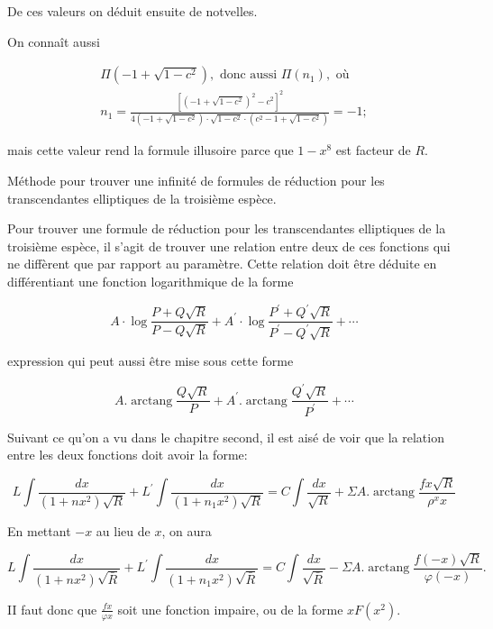 \documentclass{article}
\begin{document}
De ces valeurs on déduit ensuite de notvelles.

On connaît aussi

\[
\begin{gathered}
\Pi\left(-1+\sqrt{1-c^{2}}\right), \text { donc aussi } \Pi\left(n_{1}\right), \text { où } \\
n_{1}=\frac{\left[\left(-1+\sqrt{1-c^{2}}\right)^{2}-c^{2}\right]^{2}}{4\left(-1+\sqrt{1-c^{2}}\right) \cdot \sqrt{1-c^{2}} \cdot\left(c^{2}-1+\sqrt{1-c^{2}}\right)}=-1 ;
\end{gathered}
\]

mais cette valeur rend la formule illusoire parce que \(1-x^{8}\) est facteur de \(R\).

Méthode pour trouver une infinité de formules de réduction pour les transcendantes elliptiques de la troisième espèce.

Pour trouver une formule de réduction pour les transcendantes elliptiques de la troisième espèce, il s'agit de trouver une relation entre deux de ces fonctions qui ne diffèrent que par rapport au paramètre. Cette relation doit être déduite en différentiant une fonction logarithmique de la forme

\[
A \cdot \log \frac{P+Q \sqrt{R}}{P-Q \sqrt{R}}+A^{\prime} \cdot \log \frac{P^{\prime}+Q^{\prime} \sqrt{R}}{P^{\prime}-Q^{\prime} \sqrt{R}}+\cdots
\]

expression qui peut aussi être mise sous cette forme

\[
A . \operatorname{arctang} \frac{Q \sqrt{R}}{P}+A^{\prime} . \operatorname{arctang} \frac{Q^{\prime} \sqrt{R}}{P^{\prime}}+\cdots
\]

Suivant ce qu'on a vu dans le chapitre second, il est aisé de voir que la relation entre les deux fonctions doit avoir la forme:

\[
L \int \frac{d x}{\left(1+n x^{2}\right) \sqrt{R}}+L^{\prime} \int \frac{d x}{\left(1+n_{1} x^{2}\right) \sqrt{R}}=C \int \frac{d x}{\sqrt{R}}+\Sigma A . \operatorname{arctang} \frac{f x \sqrt{R}}{\rho^{x} x}
\]

En mettant \(-x\) au lieu de \(x\), on aura

\[
L \int \frac{d x}{\left(1+n x^{2}\right) \sqrt{\bar{R}}}+L^{\prime} \int \frac{d x}{\left(1+n_{1} x^{2}\right) \sqrt{\bar{R}}}=C \int \frac{d x}{\sqrt{\bar{R}}}-\Sigma A . \operatorname{arctang} \frac{f(-x) \sqrt{R}}{\varphi(-x)} .
\]

II faut donc que \(\frac{f x}{\varphi x}\) soit une fonction impaire, ou de la forme \(x F\left(x^{2}\right)\).
\end{document}
